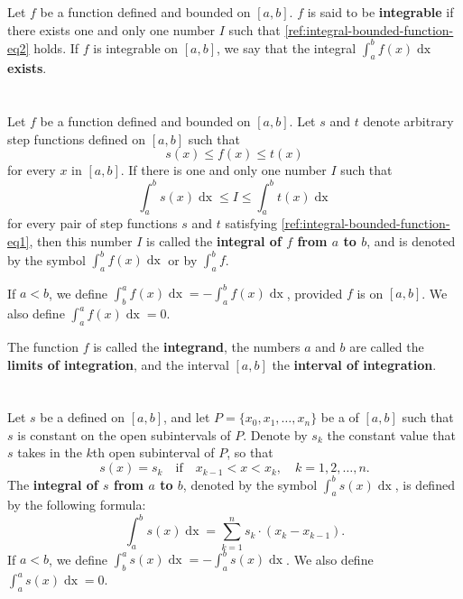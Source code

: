 \documentclass{report}
\begin{document}
Let $f$ be a function defined and bounded on $[a, b]$.
$f$ is said to be \textbf{integrable} if there exists one and only one number
  $I$ such that \eqref{ref:integral-bounded-function-eq2} holds.
If $f$ is integrable on $[a, b]$, we say that the integral
  $\int_a^b f(x) \mathop{dx}$ \textbf{exists}.

\section{}%
\label{ref:integral-bounded-function}

Let $f$ be a function defined and bounded on $[a, b]$.
Let $s$ and $t$ denote arbitrary step functions defined on $[a, b]$ such that
  \begin{equation}
    \label{ref:integral-bounded-function-eq1}
    s(x) \leq f(x) \leq t(x)
  \end{equation}
  for every $x$ in $[a, b]$.
If there is one and only one number $I$ such that
  \begin{equation}
    \label{ref:integral-bounded-function-eq2}
    \int_a^b s(x) \mathop{dx} \leq I \leq \int_a^b t(x) \mathop{dx}
  \end{equation}
  for every pair of step functions $s$ and $t$ satisfying
  \eqref{ref:integral-bounded-function-eq1}, then this number $I$ is called
  the \textbf{integral of $f$ from $a$ to $b$}, and is denoted by the symbol
  $\int_a^b f(x) \mathop{dx}$ or by $\int_a^b f$.

If $a < b$, we define $\int_b^a f(x) \mathop{dx} = -\int_a^b f(x) \mathop{dx}$,
  provided $f$ is  on $[a, b]$.
We also define $\int_a^a f(x) \mathop{dx} = 0$.

The function $f$ is called the \textbf{integrand}, the numbers $a$ and $b$ are
  called the \textbf{limits of integration}, and the interval $[a, b]$ the
  \textbf{interval of integration}.

\section{}%
\label{ref:integral-step-function}

Let $s$ be a  defined on $[a, b]$, and let
  $P = \{x_0, x_1, \ldots, x_n\}$ be a  of $[a, b]$
  such that $s$ is constant on the open subintervals of $P$.
Denote by $s_k$ the constant value that $s$ takes in the $k$th open subinterval
  of $P$, so that
  $$s(x) = s_k \quad\text{if}\quad x_{k-1} < x < x_k, \quad k
         = 1, 2, \ldots, n.$$
The \textbf{integral of $s$ from $a$ to $b$}, denoted by the symbol
  $\int_a^b s(x)\mathop{dx}$, is defined by the following formula:
  $$\int_a^b s(x) \mathop{dx} = \sum_{k=1}^n s_k \cdot (x_k - x_{k-1}).$$
If $a < b$, we define $\int_b^a s(x) \mathop{dx} = -\int_a^b s(x) \mathop{dx}$.
We also define $\int_a^a s(x) \mathop{dx} = 0$.
\end{document}
